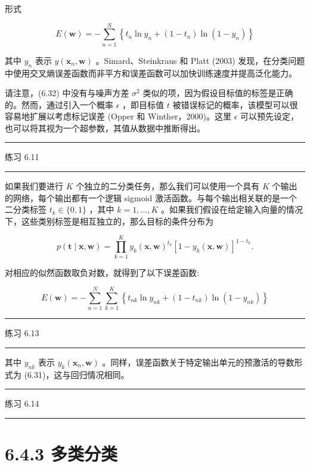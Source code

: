 \documentclass[10pt]{report}
\newcommand{\HRule}{\begin{center}\rule{0.9\linewidth}{0.2mm}\end{center}}
\begin{document}
形式

\[
E\left( \mathbf{w}\right)  =  - \mathop{\sum }\limits_{{n = 1}}^{N}\left\{  {{t}_{n}\ln {y}_{n} + \left( {1 - {t}_{n}}\right) \ln \left( {1 - {y}_{n}}\right) }\right\}   \tag{6.33}
\]

其中 \({y}_{n}\) 表示 \(y\left( {{\mathbf{x}}_{n},\mathbf{w}}\right)\) 。Simard、Steinkraus 和 Platt (2003) 发现，在分类问题中使用交叉熵误差函数而非平方和误差函数可以加快训练速度并提高泛化能力。

请注意，(6.32) 中没有与噪声方差 \({\sigma }^{2}\) 类似的项，因为假设目标值的标签是正确的。然而，通过引入一个概率 \(\epsilon\) ，即目标值 \(t\) 被错误标记的概率，该模型可以很容易地扩展以考虑标记误差 (Opper 和 Winther，2000)。这里 \(\epsilon\) 可以预先设定，也可以将其视为一个超参数，其值从数据中推断得出。

\HRule

练习 6.11

\HRule

如果我们要进行 \(K\) 个独立的二分类任务，那么我们可以使用一个具有 \(K\) 个输出的网络，每个输出都有一个逻辑 sigmoid 激活函数。与每个输出相关联的是一个二分类标签 \({t}_{k} \in  \{ 0,1\}\) ，其中 \(k = 1,\ldots ,K\) 。如果我们假设在给定输入向量的情况下，这些类别标签是相互独立的，那么目标的条件分布为

\[
p\left( {\mathbf{t} \mid  \mathbf{x},\mathbf{w}}\right)  = \mathop{\prod }\limits_{{k = 1}}^{K}{y}_{k}{\left( \mathbf{x},\mathbf{w}\right) }^{{t}_{k}}{\left\lbrack  1 - {y}_{k}\left( \mathbf{x},\mathbf{w}\right) \right\rbrack  }^{1 - {t}_{k}}. \tag{6.34}
\]

对相应的似然函数取负对数，就得到了以下误差函数:

\[
E\left( \mathbf{w}\right)  =  - \mathop{\sum }\limits_{{n = 1}}^{N}\mathop{\sum }\limits_{{k = 1}}^{K}\left\{  {{t}_{nk}\ln {y}_{nk} + \left( {1 - {t}_{nk}}\right) \ln \left( {1 - {y}_{nk}}\right) }\right\}   \tag{6.35}
\]

\HRule

练习 6.13

\HRule

其中 \({y}_{nk}\) 表示 \({y}_{k}\left( {{\mathbf{x}}_{n},\mathbf{w}}\right)\) 。同样，误差函数关于特定输出单元的预激活的导数形式为 (6.31)，这与回归情况相同。

\HRule

练习 6.14

\HRule

\section*{6.4.3 多类分类}
\end{document}
